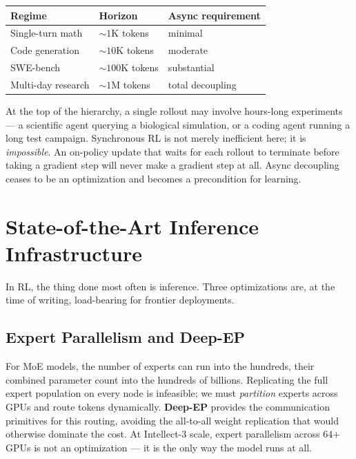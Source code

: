 \documentclass[11pt,a4paper]{article}
\theoremstyle{definition}
\theoremstyle{plain}
\begin{document}
\begin{center}
\renewcommand{\arraystretch}{1.3}
\begin{tabular}{@{}lll@{}}
\toprule
\textbf{Regime} & \textbf{Horizon} & \textbf{Async requirement} \\
\midrule
Single-turn math & $\sim\!1$K tokens & minimal \\
Code generation & $\sim\!10$K tokens & moderate \\
SWE-bench & $\sim\!100$K tokens & substantial \\
Multi-day research & $\sim\!1$M tokens & total decoupling \\
\bottomrule
\end{tabular}
\end{center}

At the top of the hierarchy, a single rollout may involve hours-long experiments --- a scientific agent querying a biological simulation, or a coding agent running a long test campaign. Synchronous RL is not merely inefficient here; it is \emph{impossible}. An on-policy update that waits for each rollout to terminate before taking a gradient step will never make a gradient step at all. Async decoupling ceases to be an optimization and becomes a precondition for learning.

\section{State-of-the-Art Inference Infrastructure}\label{sec:inference-infra}

In RL, the thing done most often is inference. Three optimizations are, at the time of writing, load-bearing for frontier deployments.

\subsection{Expert Parallelism and Deep-EP}

For MoE models, the number of experts can run into the hundreds, their combined parameter count into the hundreds of billions. Replicating the full expert population on every node is infeasible; we must \emph{partition} experts across GPUs and route tokens dynamically. \textbf{Deep-EP} provides the communication primitives for this routing, avoiding the all-to-all weight replication that would otherwise dominate the cost. At Intellect-3 scale, expert parallelism across 64+ GPUs is not an optimization --- it is the only way the model runs at all.
\end{document}
